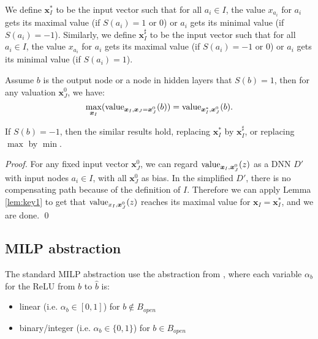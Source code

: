 			We define $\boldsymbol{x}_I^*$ to be the input vector such that for all $a_i \in I$, the value $x_{a_i}$ for $a_i$ gets its maximal value (if $S(a_i)=1$ or $0$) or $a_i$ gets its minimal value (if $S(a_i)=-1$). Similarly, we define $\boldsymbol{x}_I^\sharp$ to be the input vector such that for all $a_i \in I$, the value $x_{a_i}$ for $a_i$ gets its maximal value (if $S(a_i)=-1$ or $0$) or $a_i$ gets its minimal value (if $S(a_i)=1$).
			
			
			
			\begin{lemma} \label{lem:reach_max_2}
				
				Assume $b$ is the output node or a node in hidden layers that $S(b)=1$, then   for any valuation $\boldsymbol{x}^0_J$, 
				we have: $$\max_{\boldsymbol{x}_I} ({\textrm{value}}_{\boldsymbol{x}_I,\boldsymbol{x}_J=\boldsymbol{x}^0_J}(b)) =  {\textrm{value}}_{\boldsymbol{x}_I^*,\boldsymbol{x}^0_J}(b).$$
				
				
				
				
				
				If $S(b)=-1$, then the similar results hold, replacing $\boldsymbol{x}^*_I$ by $\boldsymbol{x}^\sharp_I$, or replacing $\max$ by $\min$. 
			\end{lemma}
			
			\begin{proof}
				
				
				For any fixed input vector $\boldsymbol{x}^0_J$, we can regard ${\textrm{value}}_{\boldsymbol{x}_I,\boldsymbol{x}^0_J}(z)$ as a DNN $D'$ with input nodes $a_i\in I$, with all $\boldsymbol{x}^0_J$ %
				as bias. In the simplified $D'$, there is no compensating path because of the definition of $I$. Therefore we can apply Lemma \ref{lem:key1} to get that ${\textrm{value}}_{x_I,\boldsymbol{x}^0_J}(z)$ reaches its maximal value for $\boldsymbol{x}_I=\boldsymbol{x}_I^*$, and we are done. \qed
			\end{proof}
			
			
			\subsection{MILP abstraction}
			
			The standard MILP abstraction use the abstraction from \cite{MILP}, 
			where each variable $\alpha_b$ for the ReLU from $b$ to $\hat{b}$ is:
			\begin{itemize}
				\item linear  (i.e. $\alpha_b \in [0,1]$) for $b \notin B_{open}$
				\item binary/integer (i.e. $\alpha_b \in \{0,1\}$) for $b \in B_{open}$
			\end{itemize}
			
